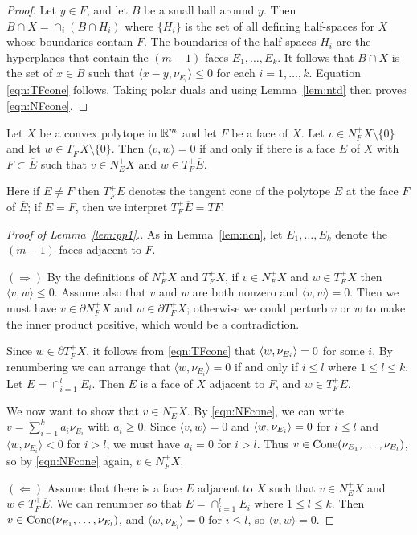 \begin{proof}
Let $y\in F$, and let $B$ be a small ball around $y$. Then $B\cap X=\cap_i(B\cap H_i)$ where $\{H_i\}$ is the set of all defining half-spaces for $X$ whose boundaries contain $F$. The boundaries of the half-spaces $H_i$ are the hyperplanes that contain the $(m-1)$-faces $E_1,\ldots, E_k$. It follows that $B\cap X$  is the set of $x\in B$ such that $\langle x-y,\nu_{E_i}\rangle \le 0$ for each $i=1,\ldots, k$. Equation \eqref{eqn:TFcone} follows. Taking polar duals and using Lemma~\ref{lem:ntd} then proves \eqref{eqn:NFcone}.
\end{proof}

\begin{lemma}
\label{lem:pp1}
Let $X$ be a convex polytope in ${\mathbb R}^m$ and let $F$ be a face of $X$. Let $v\in N_F^+X\setminus\{0\}$ and let $w\in T_F^+X\setminus\{0\}$. Then $\langle v,w\rangle = 0$ if and only if there is a face $E$ of $X$ with $F\subset \overline{E}$ such that $v\in N_E^+X$ and $w\in T_F^+\overline{E}$.
\end{lemma}

Here if $E\neq F$ then $T_F^+\overline{E}$ denotes the tangent cone of the polytope $\overline{E}$ at the face $F$ of $\overline{E}$; if $E=F$, then we interpret $T_F^+\overline{E}=TF$.

\begin{proof}[Proof of Lemma~\ref{lem:pp1}.]
As in Lemma~\ref{lem:ncn}, let $E_1,\ldots, E_k$ denote the $(m-1)$-faces adjacent to $F$.

$(\Rightarrow)$
By the definitions of $N_F^+X$ and $T_F^+X$, if $v\in N_F^+X$ and $w\in T_F^+X$ then $\langle v,w\rangle \le 0$. Assume also that $v$ and $w$ are both nonzero and $\langle v,w\rangle = 0$. Then we must have $v\in\partial N_F^+X$ and $w\in\partial T_F^+X$; otherwise we could perturb $v$ or $w$ to make the inner product positive, which would be a contradiction.

Since $w\in\partial T_F^+X$, it follows from \eqref{eqn:TFcone} that $\langle w,\nu_{E_i}\rangle = 0$ for some $i$. By renumbering we can arrange that $\langle w,\nu_{E_i}\rangle = 0$ if and only if $i\le l$ where $1\le l\le k$. Let $E=\cap_{i=1}^l E_i$. Then $E$ is a face of $X$ adjacent to $F$, and $w\in T_F^+\overline{E}$.

We now want to show that $v\in N_E^+X$. By \eqref{eqn:NFcone}, we can write $v = \sum_{i=1}^k a_i\nu_{E_i}$ with $a_i\ge 0$. Since $\langle v,w\rangle = 0$ and $\langle w,\nu_{E_i}\rangle = 0$ for $i\le l$ and $\langle w,\nu_{E_i}\rangle < 0$ for $i>l$, we must have $a_i=0$ for $i>l$. Thus $v\in\operatorname{Cone}(\nu_{E_1},\ldots,\nu_{E_l})$, so by \eqref{eqn:NFcone} again, $v\in N_F^+X$. 

$(\Leftarrow)$ Assume that there is a face $E$ adjacent to $X$ such that $v\in N_E^+X$ and $w\in T_F^+\overline{E}$. We can renumber so that $E=\cap_{i=1}^l E_i$ where $1\le l \le k$. Then $v\in\operatorname{Cone}(\nu_{E_1},\ldots,\nu_{E_l})$, and $\langle w,\nu_{E_i}\rangle = 0$ for $i\le l$, so $\langle v,w\rangle = 0$.
\end{proof}

